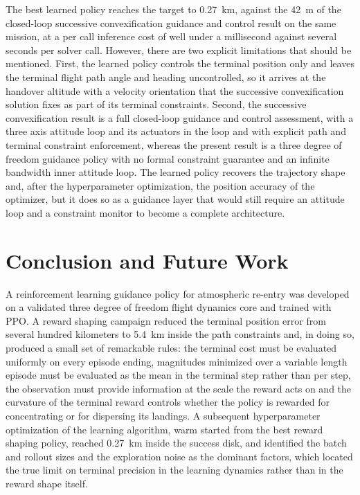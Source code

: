\documentclass[11pt]{article}
\begin{document}
The best learned policy reaches the target to \SI{0.27}{\kilo\meter}, against the \SI{42}{\meter} of the closed-loop successive convexification guidance and control result on the same mission, at a per call inference cost of well under a millisecond against several seconds per solver call. However, there are two explicit limitations that should be mentioned. First, the learned policy controls the terminal position only and leaves the terminal flight path angle and heading uncontrolled, so it arrives at the handover altitude with a velocity orientation that the successive convexification solution fixes as part of its terminal constraints. Second, the successive convexification result is a full closed-loop guidance and control assessment, with a three axis attitude loop and its actuators in the loop and with explicit path and terminal constraint enforcement, whereas the present result is a three degree of freedom guidance policy with no formal constraint guarantee and an infinite bandwidth inner attitude loop. The learned policy recovers the trajectory shape and, after the hyperparameter optimization, the position accuracy of the optimizer, but it does so as a guidance layer that would still require an attitude loop and a constraint monitor to become a complete architecture.

\section{Conclusion and Future Work}
\label{sec:conclusion}

A reinforcement learning guidance policy for atmospheric re-entry was developed on a validated three degree of freedom flight dynamics core and trained with PPO. A reward shaping campaign reduced the terminal position error from several hundred kilometers to \SI{5.4}{\kilo\meter} inside the path constraints and, in doing so, produced a small set of remarkable rules: the terminal cost must be evaluated uniformly on every episode ending, magnitudes minimized over a variable length episode must be evaluated as the mean in the terminal step rather than per step, the observation must provide information at the scale the reward acts on and the curvature of the terminal reward controls whether the policy is rewarded for concentrating or for dispersing its landings. A subsequent hyperparameter optimization of the learning algorithm, warm started from the best reward shaping policy, reached \SI{0.27}{\kilo\meter} inside the success disk, and identified the batch and rollout sizes and the exploration noise as the dominant factors, which located the true limit on terminal precision in the learning dynamics rather than in the reward shape itself.
\end{document}
